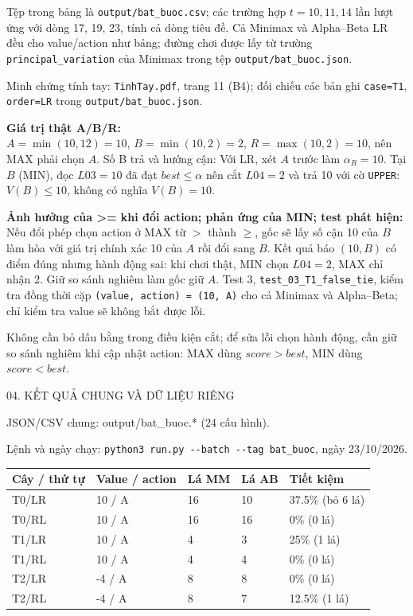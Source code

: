 \documentclass[11pt,a4paper]{article}
\newcommand{\head}[1]{\par\Needspace{3\baselineskip}\medskip{\large\sffamily\bfseries\color{Ink}#1}\par}
\newcommand{\pagehead}[1]{\clearpage\begin{tcolorbox}[colback=Ink,colframe=Ink,coltext=white,fontupper=\sffamily\large\bfseries,arc=1mm]#1\end{tcolorbox}}
\newcommand{\code}[1]{\nolinkurl{#1}}
\begin{document}
Tệp trong bảng là \texttt{output/bat\_buoc.csv}; các trường hợp $t=10,11,14$ lần lượt ứng với dòng 17, 19, 23, tính cả dòng tiêu đề. Cả Minimax và Alpha--Beta LR đều cho value/action như bảng; đường chơi được lấy từ trường \texttt{principal\_variation} của Minimax trong tệp \code{output/bat_buoc.json}.\par
\head{6. T1: kết quả điểm đúng nhưng action sai}
Minh chứng tính tay: \texttt{TinhTay.pdf}, trang 11 (B4); đối chiếu các bản ghi \texttt{case=T1}, \texttt{order=LR} trong \texttt{output/bat\_buoc.json}.\par
\textbf{Giá trị thật A/B/R:}\\ $A=\min(10,12)=10$, $B=\min(10,2)=2$, $R=\max(10,2)=10$, nên MAX phải chọn $A$. Số B trả và hướng cận: Với LR, xét $A$ trước làm $\alpha_R=10$. Tại $B$ (MIN), đọc $L03=10$ đã đạt $\mathit{best}\le\alpha$ nên cắt $L04=2$ và trả 10 với cờ \texttt{UPPER}: $V(B)\le10$, không có nghĩa $V(B)=10$.\par \textbf{Ảnh hưởng của >= khi đổi action; phản ứng của MIN; test phát hiện:}\\ Nếu đổi phép chọn action ở MAX từ $>$ thành $\ge$, gốc sẽ lấy số cận 10 của $B$ làm hòa với giá trị chính xác 10 của $A$ rồi đổi sang $B$. Kết quả báo $(10,B)$ có điểm đúng nhưng hành động sai: khi chơi thật, MIN chọn $L04=2$, MAX chỉ nhận 2. Giữ so sánh nghiêm làm gốc giữ $A$. Test 3, \texttt{test\_03\_T1\_false\_tie}, kiểm tra đồng thời cặp \texttt{(value, action) = (10, A)} cho cả Minimax và Alpha--Beta; chỉ kiểm tra value sẽ không bắt được lỗi.\par\medskip
Không cần bỏ dấu bằng trong điều kiện cắt; để sửa lỗi chọn hành động, cần giữ so sánh nghiêm khi cập nhật action: MAX dùng $\mathit{score}>\mathit{best}$, MIN dùng $\mathit{score}<\mathit{best}$.\par\medskip
\pagehead{04. KẾT QUẢ CHUNG VÀ DỮ LIỆU RIÊNG}
JSON/CSV chung: output/bat\_buoc.* (24 cấu hình).\par
Lệnh và ngày chạy: \texttt{python3 run.py -{}-batch -{}-tag bat\_buoc}, ngày 23/10/2026.\par\medskip
\begingroup\footnotesize\renewcommand{\arraystretch}{1.45}\begin{tabularx}{\linewidth}{XXXXX}\toprule
\textbf{Cây / thứ tự} & \textbf{Value / action} & \textbf{Lá MM} & \textbf{Lá AB} & \textbf{Tiết kiệm}\\\midrule
T0/LR & 10 / A & 16 & 10 & 37.5\% (bỏ 6 lá)\\
T0/RL & 10 / A & 16 & 16 & 0\% (0 lá)\\
T1/LR & 10 / A & 4 & 3 & 25\% (1 lá)\\
T1/RL & 10 / A & 4 & 4 & 0\% (0 lá)\\
T2/LR & -4 / A & 8 & 8 & 0\% (0 lá)\\
T2/RL & -4 / A & 8 & 7 & 12.5\% (1 lá)\\
\bottomrule\end{tabularx}\endgroup\par\medskip
\end{document}
